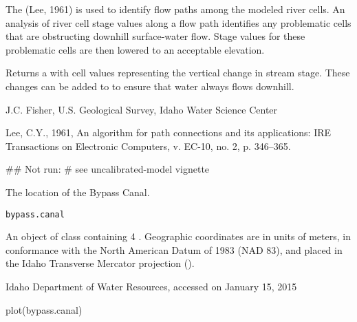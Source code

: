 \documentclass[a4paper]{book}
\begin{document}
%
\begin{Details}\relax
The  (Lee, 1961) is used to identify flow paths among the modeled river cells.
An analysis of river cell stage values along a flow path identifies any problematic cells that are obstructing downhill surface-water flow.
Stage values for these problematic cells are then lowered to an acceptable elevation.
\end{Details}
%
\begin{Value}
Returns a  with cell values representing the vertical change in stream stage.
These changes can be added to  to ensure that water always flows downhill.
\end{Value}
%
\begin{Author}\relax
J.C. Fisher, U.S. Geological Survey, Idaho Water Science Center
\end{Author}
%
\begin{References}\relax
Lee, C.Y., 1961, An algorithm for path connections and its applications: IRE Transactions on Electronic Computers, v. EC-10, no. 2, p. 346--365.
\end{References}
%
\begin{Examples}
\begin{ExampleCode}
## Not run: # see uncalibrated-model vignette
\end{ExampleCode}
\end{Examples}
%
\begin{Description}\relax
The location of the Bypass Canal.
\end{Description}
%
\begin{Usage}
\begin{verbatim}
bypass.canal
\end{verbatim}
\end{Usage}
%
\begin{Format}
An object of  class containing 4 .
Geographic coordinates are in units of meters, in conformance with the North American Datum of 1983 (NAD 83), and placed in the
Idaho Transverse Mercator projection ().
\end{Format}
%
\begin{Source}\relax
Idaho Department of Water Resources, accessed on January 15, 2015
\end{Source}
%
\begin{Examples}
\begin{ExampleCode}
plot(bypass.canal)
\end{ExampleCode}
\end{Examples}
\end{document}
